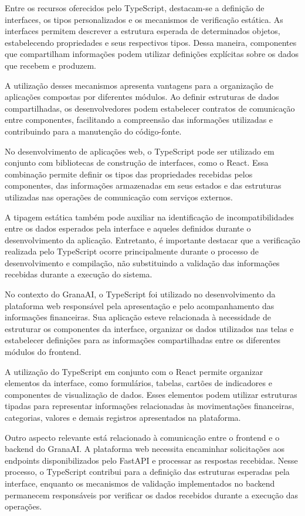 Entre os recursos oferecidos pelo TypeScript, destacam-se a definição de interfaces, os tipos personalizados e os mecanismos de verificação estática. As interfaces permitem descrever a estrutura esperada de determinados objetos, estabelecendo propriedades e seus respectivos tipos. Dessa maneira, componentes que compartilham informações podem utilizar definições explícitas sobre os dados que recebem e   produzem.

A utilização desses mecanismos apresenta vantagens para a organização de aplicações compostas por diferentes módulos. Ao definir estruturas de dados compartilhadas, os desenvolvedores podem estabelecer contratos de comunicação entre componentes, facilitando a compreensão das informações utilizadas e contribuindo para a manutenção do código-fonte.

No desenvolvimento de aplicações web, o TypeScript pode ser utilizado em conjunto com bibliotecas de construção de interfaces, como o React. Essa combinação permite definir os tipos das propriedades recebidas pelos componentes, das informações armazenadas em seus estados e das estruturas utilizadas nas operações de comunicação com serviços externos.

A tipagem estática também pode auxiliar na identificação de incompatibilidades entre os dados esperados pela interface e aqueles definidos durante o desenvolvimento da aplicação. Entretanto, é importante destacar que a verificação realizada pelo TypeScript ocorre principalmente durante o processo de desenvolvimento e compilação, não substituindo a validação das informações recebidas durante a execução do sistema.

No contexto do GranaAI, o TypeScript foi utilizado no desenvolvimento da plataforma web responsável pela apresentação e pelo acompanhamento das informações financeiras. Sua aplicação esteve relacionada à necessidade de estruturar os componentes da interface, organizar os dados utilizados nas telas e estabelecer definições para as informações compartilhadas entre os diferentes módulos do frontend.

A utilização do TypeScript em conjunto com o React permite organizar elementos da interface, como formulários, tabelas, cartões de indicadores e componentes de visualização de dados. Esses elementos podem utilizar estruturas tipadas para representar informações relacionadas às movimentações financeiras, categorias, valores e demais registros apresentados na plataforma.

Outro aspecto relevante está relacionado à comunicação entre o frontend e o backend do GranaAI. A plataforma web necessita encaminhar solicitações aos endpoints disponibilizados pelo FastAPI e processar as respostas recebidas. Nesse processo, o TypeScript contribui para a definição das estruturas esperadas pela interface, enquanto os mecanismos de validação implementados no backend permanecem responsáveis por verificar os dados recebidos durante a execução das operações.

